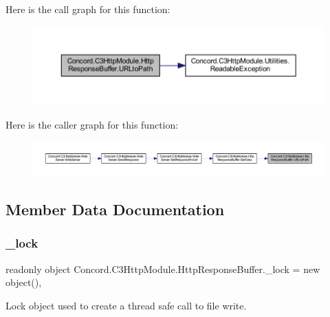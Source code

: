 Here is the call graph for this function\+:
\nopagebreak
\begin{figure}[H]
\begin{center}
\leavevmode
\includegraphics[width=350pt]{class_concord_1_1_c3_http_module_1_1_http_response_buffer_afa05ddc467a347089e0e0f5d7dea8a4c_cgraph}
\end{center}
\end{figure}
Here is the caller graph for this function\+:
\nopagebreak
\begin{figure}[H]
\begin{center}
\leavevmode
\includegraphics[width=350pt]{class_concord_1_1_c3_http_module_1_1_http_response_buffer_afa05ddc467a347089e0e0f5d7dea8a4c_icgraph}
\end{center}
\end{figure}


\subsection{Member Data Documentation}
\mbox{\label{class_concord_1_1_c3_http_module_1_1_http_response_buffer_a6846fa3b517f31f92ed4a2a15cb1767b}} 
\subsubsection{\texorpdfstring{\_lock}{\_lock}}
{\footnotesize\ttfamily readonly object Concord.\+C3\+Http\+Module.\+Http\+Response\+Buffer.\+\_\+lock = new object()\hspace{0.3cm}{\ttfamily [static]}, {\ttfamily [private]}}



Lock object used to create a thread safe call to file write. 



